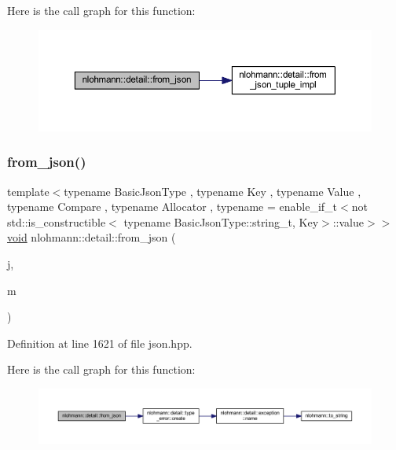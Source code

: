 Here is the call graph for this function\+:
\nopagebreak
\begin{figure}[H]
\begin{center}
\leavevmode
\includegraphics[width=350pt]{namespacenlohmann_1_1detail_a8b99ec9b29f3f20a18fc4281fb784e49_cgraph}
\end{center}
\end{figure}
\mbox{\label{namespacenlohmann_1_1detail_ae93147a54d2740228ef16a5e6210ca3e}} 
\subsubsection{\texorpdfstring{from\_json()}{from\_json()}\hspace{0.1cm}{\footnotesize\ttfamily [17/18]}}
{\footnotesize\ttfamily template$<$typename Basic\+Json\+Type , typename Key , typename Value , typename Compare , typename Allocator , typename  = enable\+\_\+if\+\_\+t$<$not std\+::is\+\_\+constructible$<$                                     typename Basic\+Json\+Type\+::string\+\_\+t, Key$>$\+::value$>$$>$ \\
\mbox{\hyperlink{namespacenlohmann_1_1detail_a59fca69799f6b9e366710cb9043aa77d}{void}} nlohmann\+::detail\+::from\+\_\+json (\begin{DoxyParamCaption}\item[{const Basic\+Json\+Type \&}]{j,  }\item[{std\+::map$<$ Key, Value, Compare, Allocator $>$ \&}]{m }\end{DoxyParamCaption})}



Definition at line 1621 of file json.\+hpp.

Here is the call graph for this function\+:
\nopagebreak
\begin{figure}[H]
\begin{center}
\leavevmode
\includegraphics[width=350pt]{namespacenlohmann_1_1detail_ae93147a54d2740228ef16a5e6210ca3e_cgraph}
\end{center}
\end{figure}
\mbox{\label{namespacenlohmann_1_1detail_aef5c8ea108f4d2b03fb4a635617510de}} 
